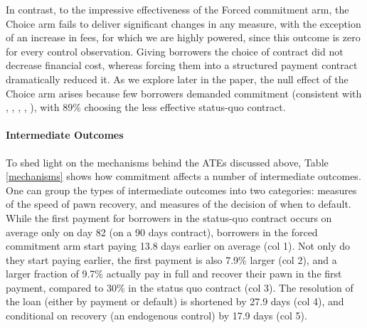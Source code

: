 \documentclass[12pt, a4paper]{article}
\begin{document}
In contrast, to the impressive effectiveness of the Forced commitment arm, the Choice arm fails to deliver significant changes in any measure, with the exception of an increase in fees, for which we are highly powered, since this outcome is zero for every control observation. Giving borrowers the choice of contract did not decrease financial cost, whereas forcing them into a structured payment contract dramatically reduced it. As we explore later in the paper, the null effect of the Choice arm arises because few borrowers demanded commitment (consistent with \cite{Ashraf}, \cite{Gine}, \cite{Ted}, \cite{Royer}, \cite{Sprenger}), with 89\% choosing the less effective status-quo contract.

\paragraph*{Intermediate Outcomes} To shed light on the mechanisms behind the ATEs discussed above, Table \ref{mechanisms} shows how commitment affects a number of intermediate outcomes. One can group the types of intermediate outcomes into two categories: measures of the speed of pawn recovery, and measures of the decision of when to default. While the first payment for borrowers in the status-quo contract occurs on average only on day 82 (on a 90 days contract), borrowers in the forced commitment arm start paying 13.8 days earlier on average (col 1). Not only do they start paying earlier, the first payment is also 7.9\% larger (col 2), and a larger fraction of 9.7\% actually pay in full and recover their pawn in the first payment, compared to 30\% in the status quo contract (col 3). The resolution of the loan (either by payment or default) is shortened by 27.9 days (col 4), and conditional on recovery (an endogenous control) by 17.9 days (col 5).
\end{document}
